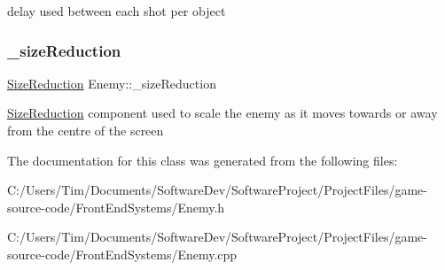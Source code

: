 delay used between each shot per object \mbox{\label{class_enemy_af8b4d39339f59407b7fd9cd1d6246860}} 
\subsubsection{\texorpdfstring{\+\_\+size\+Reduction}{\_sizeReduction}}
{\footnotesize\ttfamily \hyperlink{class_size_reduction}{Size\+Reduction} Enemy\+::\+\_\+size\+Reduction\hspace{0.3cm}{\ttfamily [private]}}

\hyperlink{class_size_reduction}{Size\+Reduction} component used to scale the enemy as it moves towards or away from the centre of the screen 

The documentation for this class was generated from the following files\+:\begin{DoxyCompactItemize}
\item 
C\+:/\+Users/\+Tim/\+Documents/\+Software\+Dev/\+Software\+Project/\+Project\+Files/game-\/source-\/code/\+Front\+End\+Systems/Enemy.\+h\item 
C\+:/\+Users/\+Tim/\+Documents/\+Software\+Dev/\+Software\+Project/\+Project\+Files/game-\/source-\/code/\+Front\+End\+Systems/Enemy.\+cpp\end{DoxyCompactItemize}
